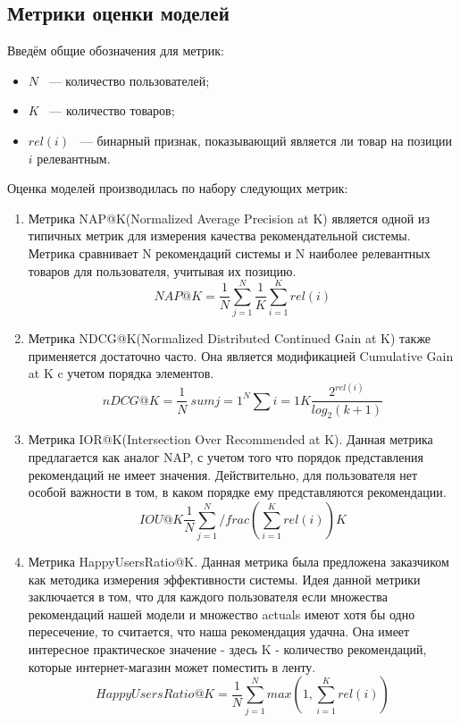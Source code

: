 \documentclass[14pt]{mmcs_article}
\begin{document}
\subsection{Метрики оценки моделей}
Введём общие обозначения для метрик:
\begin{itemize}
	\item $N$  ~--- количество пользователей;
	\item $K$  ~--- количество товаров;
	\item $rel(i)$ ~--- бинарный признак, показывающий является ли товар на позиции $i$ релевантным.
\end{itemize}


Оценка моделей производилась по набору следующих метрик:
\begin{enumerate}
	\item Метрика NAP@K(Normalized Average Precision at K) является одной из типичных метрик для измерения качества рекомендательной системы. Метрика сравнивает N рекомендаций системы и N наиболее релевантных товаров для пользователя, учитывая их позицию. 
	\begin{equation}
		NAP@K = \frac{1}{N} \sum_{j=1}^{N} \frac{1}{K}\sum_{i=1}^{K}rel(i)
	\end{equation}
	\item Метрика NDCG@K(Normalized Distributed Continued Gain at K) также применяется достаточно часто. Она является модификацией Cumulative Gain at K c учетом порядка элементов.
	\begin{equation}
		nDCG@K= \frac{1}{N} \ sum{j=1}^N \sum{i=1}{K} \frac{2^{rel(i)} }{log_2(k+1)} 	
    \end{equation}   
	\item Метрика IOR@K(Intersection Over Recommended at K). Данная метрика предлагается как аналог NAP, с учетом того что порядок представления рекомендаций не имеет значения. Действительно, для пользователя нет особой важности в том, в каком порядке ему представляются рекомендации.
	\begin{equation}
		IOU@K \frac{1}{N} \sum_{j=1}^N  /frac{(\sum_{i=1}^{K} rel(i))}{K} 
	\end{equation} 
	\item Метрика HappyUsersRatio@K. Данная метрика была предложена заказчиком как методика измерения эффективности системы. Идея данной метрики заключается в том, что для каждого пользователя если множества рекомендаций нашей модели и множество actuals имеют хотя бы одно пересечение, то считается, что наша рекомендация удачна. Она имеет интересное практическое значение - здесь K - количество рекомендаций, которые интернет-магазин может поместить в ленту.
	\begin{equation}
	   HappyUsersRatio@K = \frac{1}{N}\sum_{j=1}^{N} max(1,\sum_{i=1}^{K} rel(i)) 		
	\end{equation}
\end{enumerate}
\end{document}
